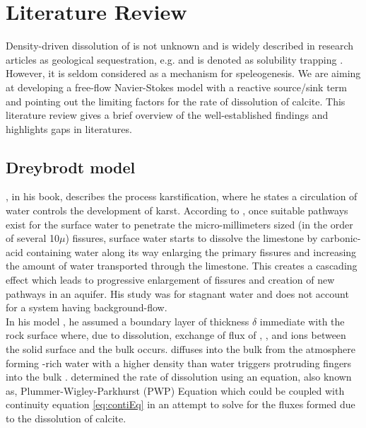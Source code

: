 \chapter{Literature Review}\label{chapter:LiteratureReview}
\thispagestyle{empty}

Density-driven dissolution of  is not unknown and is widely described in research articles as 
geological sequestration, e.g.\cite{lindeberg1997reservoir, bachu2007co2} and is denoted as solubility 
trapping \cite{metz2005carbon}. However, it is seldom considered as a mechanism for speleogenesis. 
We are aiming at developing a free-flow Navier-Stokes model with a reactive source/sink term and pointing 
out the limiting factors for the rate of dissolution of calcite. This literature review gives a 
brief overview of the well-established findings and highlights gaps in literatures.

\section{Dreybrodt model}\label{sec:dreybrodt}
\citet{Dreybrodt2012}, in his book, describes the process karstification, where he states a circulation of water 
controls the development of karst. According to \citet{Dreybrodt2012}, once suitable pathways exist for the 
surface water to penetrate the micro-millimeters sized (in the order of several 10$\mu$) fissures, surface 
water starts to dissolve the limestone by carbonic-acid containing water along its way enlarging the primary fissures 
and increasing the amount of water transported through the limestone. This creates a cascading effect which leads 
to progressive enlargement of fissures and creation of new pathways in an aquifer. His study was for stagnant water 
and does not account for a system having background-flow.\\

In his model \cite{Dreybrodt2012}, he assumed a boundary layer of thickness $\delta$ immediate with the rock surface 
where, due to dissolution, exchange of flux of , , and  ions between the solid 
surface and the bulk occurs.  diffuses into the bulk from the atmosphere forming -rich water with a 
higher density than water triggers protruding fingers into the bulk \cite{Class2020}. \citet{Plummer1978} determined 
the rate of dissolution using an equation, also known as, Plummer-Wigley-Parkhurst (PWP) Equation which could be coupled 
with continuity equation \ref{eq:contiEq} in an attempt to solve for the fluxes formed due to the dissolution of calcite.

